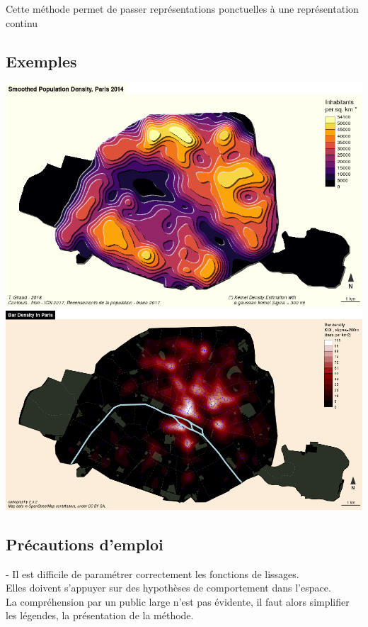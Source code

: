 \documentclass[]{book}
\begin{document}
Cette méthode permet de passer représentations ponctuelles à une représentation continu

\hypertarget{exemples-1}{%
\subsection{Exemples}\label{exemples-1}}

\includegraphics{img/liss1.png}
\includegraphics{img/liss2.png}

\hypertarget{precautions-demploi-5}{%
\subsection{Précautions d'emploi}\label{precautions-demploi-5}}

- Il est difficile de paramétrer correctement les fonctions de lissages.\\
Elles doivent s'appuyer sur des hypothèses de comportement dans l'espace.\\
La compréhension par un public large n'est pas évidente, il faut alors simplifier les légendes, la présentation de la méthode.
\end{document}
